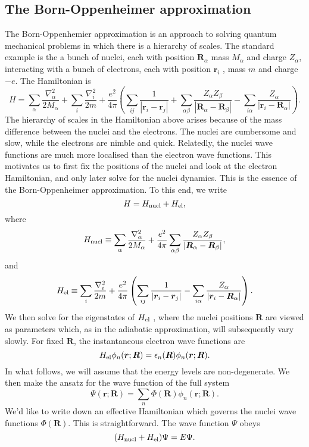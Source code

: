 \subsection{The Born-Oppenheimer approximation}
The Born-Oppenhemier approximation is an approach to solving quantum mechanical problems in which there is a hierarchy of scales. 
The standard example is the a bunch of nuclei, each with position $\bm{R}_{\alpha}$ mass $M_{\alpha}$ and charge $Z_{\alpha}$, interacting with a bunch of electrons, each with position $\bm{r}_i$ , mass $m$ and charge $-e$. 
The Hamiltonian is
\[H = \sum_{\alpha} \frac{\nabla^2_{\alpha}}{2M_{\alpha}} + \sum_{i} \frac{\nabla^2_{i}}{2m} + \frac{e^2}{4\pi} \left(\sum_{ij} \frac{1}{|\bm{r}_i - \bm{r}_j|} + \sum_{\alpha \beta} \frac{Z_{\alpha} Z_{\beta}}{|\bm{R}_{\alpha} - \bm{R}_{\beta}|} - \sum_{i\alpha} \frac{Z_{\alpha}}{|\bm{r}_i - \bm{R}_{\alpha}|} \right).\]
The hierarchy of scales in the Hamiltonian above arises because of the mass difference between the nuclei and the electrons. The nuclei are cumbersome and slow, while the
electrons are nimble and quick. 
Relatedly, the nuclei wave functions are much more
localised than the electron wave functions. This motivates us to first fix the positions of the nuclei and look at the electron Hamiltonian, and only later solve for the nuclei dynamics. This is the essence of the Born-Oppenheimer approximation.
To this end, we write
\[H = H_{\rm nucl} + H_{\rm el},\]
where
\[H_{\rm nucl} \equiv \sum_{\alpha} \frac{\nabla^2_{\alpha}}{2M_{\alpha}} + \frac{e^2}{4\pi}  \sum_{\alpha \beta} \frac{Z_{\alpha} Z_{\beta}}{|\bm{R}_{\alpha} - \bm{R}_{\beta}|},\]
and
\[H_{\rm el} \equiv  \sum_{i} \frac{\nabla^2_{i}}{2m} + \frac{e^2}{4\pi} \left(\sum_{ij} \frac{1}{|\bm{r}_i - \bm{r}_j|}  - \sum_{i\alpha} \frac{Z_{\alpha}}{|\bm{r}_i - \bm{R}_{\alpha}|} \right).\]
We then solve for the eigenstates of $H_{\rm el}$ , where the nuclei positions $\bm{R}$ are viewed as parameters which, as in the adiabatic approximation, will subsequently vary slowly.
For fixed $\bm{R}$, the instantaneous electron wave functions are
\[H_{\rm el} \phi_n(\bm{r};\bm{R}) = \epsilon_n(\bm{R}) \phi_n(\bm{r};\bm{R}).\]
In what follows, we will assume that the energy levels are non-degenerate. We then make the ansatz for the wave function of the full system
\[\Psi(\bm{r};\bm{R}) = \sum_n \Phi(\bm{R})\phi_n(\bm{r};\bm{R}).\]
We'd like to write down an effective Hamiltonian which governs the nuclei wave functions $\Phi(\bm{R})$. 
This is straightforward. The wave function $\Psi$ obeys
\[(H_{\rm nucl} + H_{\rm el}) \Psi = E\Psi.\]
